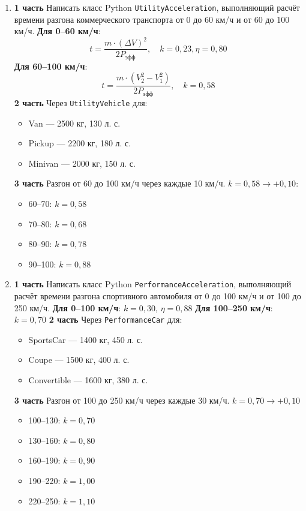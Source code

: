 \begin{enumerate}
    \item[3] \textbf{1 часть}  
    Написать класс Python \texttt{UtilityAcceleration}, выполняющий расчёт времени разгона коммерческого транспорта от 0 до 60 км/ч и от 60 до 100 км/ч.  
    \textbf{Для 0–60 км/ч}:  
    \begin{equation}
    t = \frac{m \cdot (\Delta V)^2}{2P_{\text{эфф}}}, \quad k = 0{,}23, \eta = 0{,}80
    \end{equation}
    \textbf{Для 60–100 км/ч}:  
    \begin{equation}
    t = \frac{m \cdot (V_2^2 - V_1^2)}{2P_{\text{эфф}}}, \quad k = 0{,}58
    \end{equation}
    \textbf{2 часть}  
    Через \texttt{UtilityVehicle} для:  
    \begin{itemize}
        \item Van — 2500 кг, 130 л. с.  
        \item Pickup — 2200 кг, 180 л. с.  
        \item Minivan — 2000 кг, 150 л. с.  
    \end{itemize}
    \textbf{3 часть}  
    Разгон от 60 до 100 км/ч через каждые 10 км/ч. $k = 0{,}58 \to +0{,}10$:  
    \begin{itemize}
        \item 60–70: $k = 0{,}58$  
        \item 70–80: $k = 0{,}68$  
        \item 80–90: $k = 0{,}78$  
        \item 90–100: $k = 0{,}88$  
    \end{itemize}

    \item[4] \textbf{1 часть}  
    Написать класс Python \texttt{PerformanceAcceleration}, выполняющий расчёт времени разгона спортивного автомобиля от 0 до 100 км/ч и от 100 до 250 км/ч.  
    \textbf{Для 0–100 км/ч}: $k = 0{,}30$, $\eta = 0{,}88$  
    \textbf{Для 100–250 км/ч}: $k = 0{,}70$  
    \textbf{2 часть}  
    Через \texttt{PerformanceCar} для:  
    \begin{itemize}
        \item SportsCar — 1400 кг, 450 л. с.  
        \item Coupe — 1500 кг, 400 л. с.  
        \item Convertible — 1600 кг, 380 л. с.  
    \end{itemize}
    \textbf{3 часть}  
    Разгон от 100 до 250 км/ч через каждые 30 км/ч. $k = 0{,}70 \to +0{,}10$  
    \begin{itemize}
        \item 100–130: $k = 0{,}70$  
        \item 130–160: $k = 0{,}80$  
        \item 160–190: $k = 0{,}90$  
        \item 190–220: $k = 1{,}00$  
        \item 220–250: $k = 1{,}10$  
    \end{itemize}


\end{enumerate}
